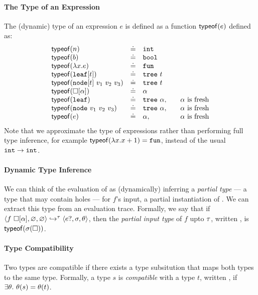 \paragraph{The Type of an Expression} The (dynamic) type of an
expression $e$ is defined as a function $\mathsf{typeof}(e)$ defined as:
  \[
  \begin{array}{lcll}
    \typeof{n}   & \defeq & \tint & \\
    \typeof{b}   & \defeq & \tbool & \\
    \typeof{\efun{x}{e}} & \defeq & \tfun \\
    \typeof{\vleaf{t}} & \defeq & \ttree{t} \\
    \typeof{\vnode{t}{v_1}{v_2}{v_3}} & \defeq & \ttree{t} \\
    \typeof{\vhole{\thole}} & \defeq & \thole \\
    \typeof{\eleaf} & \defeq & \ttree{\thole}, & \quad \text{\thole is fresh} \\
    \typeof{\enode{v_1}{v_2}{v_3}} & \defeq & \ttree{\thole}, & \quad \text{\thole is fresh} \\
    \typeof{e} & \defeq & \thole, & \quad \text{\thole is fresh} \\
  \end{array}
  \]
%
Note that we approximate the type of expressions rather than
performing full type inference, for example
$\mathsf{typeof}(\lambda x. x + 1) = \mathtt{fun}$,
instead of the usual $\mathtt{int} \rightarrow \mathtt{int}$.

\paragraph{Dynamic Type Inference}
We can think of the evaluation of  as (dynamically)
inferring a \emph{partial type} --- a type that may contain holes ---
for $f$'s input, \ie a partial instantiation of \thole.
%
We can extract this type from an evaluation trace.
%
Formally, we say that if
$\langle f\ \square[\alpha], \varnothing, \varnothing \rangle \hookrightarrow^{\tau} \langle e?, \sigma, \theta \rangle$,
then the \emph{partial input type} of $f$ upto $\tau$, written
, is
$\mathsf{typeof}(\sigma(\square))$.
%

\paragraph{Type Compatibility}
Two types are compatible if there exists a type subsitution that maps both
types to the same type.
%
Formally, a type $s$ is
\emph{compatible} with a type $t$, written , if
$\exists \theta.\ \theta(s) = \theta(t)$.


